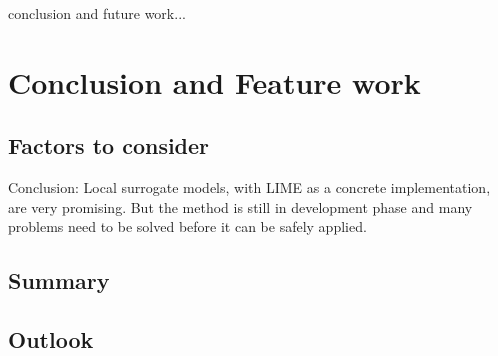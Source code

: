 conclusion and future work...

\section{Conclusion and Feature work}


\subsection{Factors to consider}
Conclusion: Local surrogate models, with LIME as a concrete implementation, are very promising. But the method is still in development phase and many problems need to be solved before it can be safely applied.
\subsection{Summary}

\subsection{Outlook}